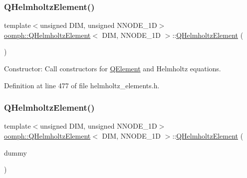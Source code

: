 \subsubsection{\texorpdfstring{Q\+Helmholtz\+Element()}{QHelmholtzElement()}\hspace{0.1cm}{\footnotesize\ttfamily [1/2]}}
{\footnotesize\ttfamily template$<$unsigned D\+IM, unsigned N\+N\+O\+D\+E\+\_\+1D$>$ \\
\hyperlink{classoomph_1_1QHelmholtzElement}{oomph\+::\+Q\+Helmholtz\+Element}$<$ D\+IM, N\+N\+O\+D\+E\+\_\+1D $>$\+::\hyperlink{classoomph_1_1QHelmholtzElement}{Q\+Helmholtz\+Element} (\begin{DoxyParamCaption}{ }\end{DoxyParamCaption})\hspace{0.3cm}{\ttfamily [inline]}}



Constructor\+: Call constructors for \hyperlink{classoomph_1_1QElement}{Q\+Element} and Helmholtz equations. 



Definition at line 477 of file helmholtz\+\_\+elements.\+h.

\mbox{\label{classoomph_1_1QHelmholtzElement_a589e3ccd70828be0777a15ebae315965}} 
\subsubsection{\texorpdfstring{Q\+Helmholtz\+Element()}{QHelmholtzElement()}\hspace{0.1cm}{\footnotesize\ttfamily [2/2]}}
{\footnotesize\ttfamily template$<$unsigned D\+IM, unsigned N\+N\+O\+D\+E\+\_\+1D$>$ \\
\hyperlink{classoomph_1_1QHelmholtzElement}{oomph\+::\+Q\+Helmholtz\+Element}$<$ D\+IM, N\+N\+O\+D\+E\+\_\+1D $>$\+::\hyperlink{classoomph_1_1QHelmholtzElement}{Q\+Helmholtz\+Element} (\begin{DoxyParamCaption}\item[{const \hyperlink{classoomph_1_1QHelmholtzElement}{Q\+Helmholtz\+Element}$<$ D\+IM, N\+N\+O\+D\+E\+\_\+1D $>$ \&}]{dummy }\end{DoxyParamCaption})\hspace{0.3cm}{\ttfamily [inline]}}



